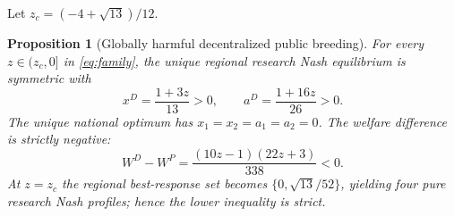 \documentclass[USenglish]{article}
\newtheorem{proposition}{Proposition}
\begin{document}
Let $z_c=(-4+\sqrt{13})/12$.

\begin{proposition}[Globally harmful decentralized public breeding]
For every $z\in(z_c,0]$ in \eqref{eq:family}, the unique regional research Nash equilibrium is symmetric with
\begin{equation}
 x^D=\frac{1+3z}{13}>0,\qquad
 a^D=\frac{1+16z}{26}>0.
 \label{eq:p3nash}
\end{equation}
The unique national optimum has $x_1=x_2=a_1=a_2=0$. The welfare difference is strictly negative:
\begin{equation}
 W^D-W^P=\frac{(10z-1)(22z+3)}{338}<0.
 \label{eq:p3loss}
\end{equation}
At $z=z_c$ the regional best-response set becomes $\{0,\sqrt{13}/52\}$, yielding four pure research Nash profiles; hence the lower inequality is strict.
\end{proposition}
\end{document}
